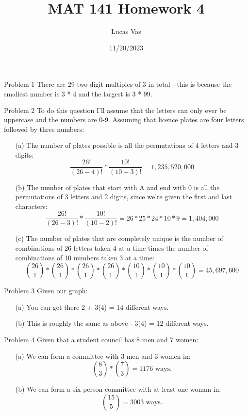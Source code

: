 \documentclass[12pt]{article}
\title{MAT 141 Homework 4}
\author{Lucas Vas}
\date{11/20/2023}
\begin{document}
    
    \maketitle

    \begin{problem}{Problem 1}
        There are 29 two digit multiples of 3 in total - this is because the smallest number is 3 * 4 and the largest is
        3 * 99. 
    \end{problem}

    \begin{problem}{Problem 2}
        To do this question I'll assume that the letters can only ever be uppercase and the numbers are 0-9.
        Assuming that licence plates are four letters followed by three numbers:
        \begin{itemize}
            \item[(a)] The number of plates possible is all the permutations of 4 letters and 3 digits:
                \[\frac{26!}{(26-4)!} * \frac{10!}{(10-3)!} = 1,235,520,000\]
            \item[(b)] The number of plates that start with A and end with 0 is all the permutations of
                3 letters and 2 digits, since we're given the first and last characters:
                \[\frac{26!}{(26-3)!} * \frac{10!}{(10-2)!} = 26 * 25 * 24 * 10 * 9 = 1,404,000\]
            \item[(c)] The number of plates that are completely unique is the number of combinations of 26 letters
                taken 4 at a time times the number of combinations of 10 numbers taken 3 at a time:
                \[\binom{26}{1} * \binom{26}{1} * \binom{26}{1} * \binom{26}{1} * \binom{10}{1} * \binom{10}{1} * \binom{10}{1} = 45,697,600\]
        \end{itemize}
    \end{problem}

    \begin{problem}{Problem 3}
        Given our graph:
        \begin{itemize}
            \item[(a)] You can get there 2 + 3(4) = 14 different ways.
            \item[(b)] This is roughly the same as above - 3(4) = 12 different ways.
        \end{itemize}
    \end{problem}

    \begin{problem}{Problem 4}
        Given that a student council has 8 men and 7 women:
        \begin{itemize}
            \item[(a)] We can form a committee with 3 men and 3 women in: \[\binom{8}{3} * \binom{7}{3} = 1176 \text{ ways.}\]
            \item[(b)] We can form a six person committee with at least one woman in: \[\binom{15}{5} = 3003 \text{ ways.}\]
        \end{itemize}
    \end{problem}
\end{document}
